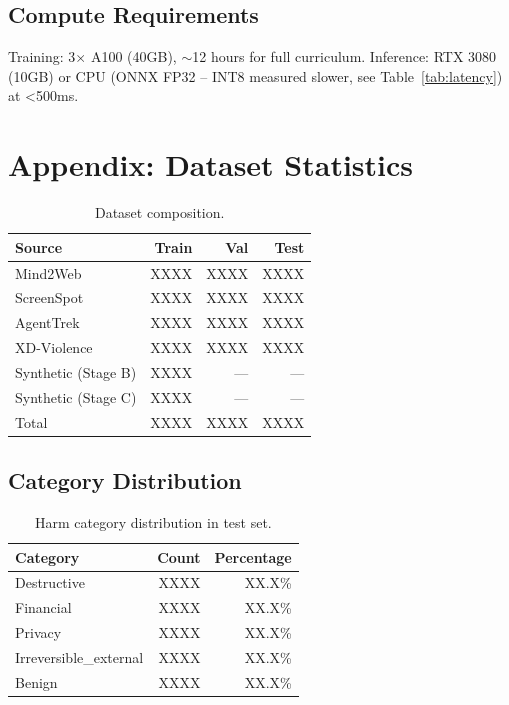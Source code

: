 \documentclass[11pt,a4paper]{article}
\begin{document}
\subsection{Compute Requirements}
Training: 3$\times$ A100 (40GB), $\sim$12 hours for full curriculum. Inference: RTX 3080 (10GB) or CPU (ONNX FP32 -- INT8 measured slower, see Table~\ref{tab:latency}) at \textless 500ms.

\section{Appendix: Dataset Statistics}
\begin{table}[H]
\centering
\caption{Dataset composition.}
\label{tab:dataset_stats}
\begin{tabular}{lrrr}
\toprule
Source & Train & Val & Test \\
\midrule
Mind2Web & XXXX & XXXX & XXXX \\
ScreenSpot & XXXX & XXXX & XXXX \\
AgentTrek & XXXX & XXXX & XXXX \\
XD-Violence & XXXX & XXXX & XXXX \\
Synthetic (Stage B) & XXXX & --- & --- \\
Synthetic (Stage C) & XXXX & --- & --- \\
\hline
Total & XXXX & XXXX & XXXX \\
\bottomrule
\end{tabular}
\end{table}

\subsection{Category Distribution}
\begin{table}[H]
\centering
\caption{Harm category distribution in test set.}
\label{tab:category_dist}
\begin{tabular}{lrr}
\toprule
Category & Count & Percentage \\
\midrule
Destructive & XXXX & XX.X\% \\
Financial & XXXX & XX.X\% \\
Privacy & XXXX & XX.X\% \\
Irreversible\_external & XXXX & XX.X\% \\
Benign & XXXX & XX.X\% \\
\bottomrule
\end{tabular}
\end{table}
\end{document}
